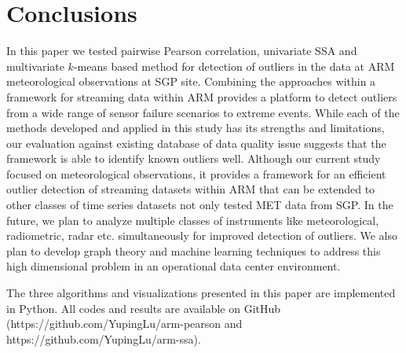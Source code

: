 \section{Conclusions}
In this paper we tested pairwise Pearson correlation,
univariate SSA and multivariate $k$-means based method for detection of
outliers in the data at ARM meteorological observations at SGP site. 
Combining the approaches within a framework for
streaming data within ARM provides a platform to detect outliers
from a wide range of sensor failure scenarios to extreme events.
While each of the methods developed and applied in this study has its
strengths and limitations, our evaluation against existing database of
data quality issue suggests that the framework is able to identify known
outliers well. Although our current study focused on
meteorological observations, it provides a framework for an efficient
outlier detection of streaming datasets within ARM that can be extended to
other classes of time series datasets not only tested MET data from SGP. 
In the future, we plan to analyze multiple
classes of instruments like meteorological, radiometric, radar etc.
simultaneously for improved detection of outliers. We also plan to
develop graph theory \cite{phillips2015graph} and machine learning techniques to address this
high dimensional problem in an operational data center environment.

The three algorithms and visualizations presented in this paper are 
implemented in Python. All codes and results are available on GitHub 
(https://github.com/YupingLu/arm-pearson and https://github.com/YupingLu/arm-ssa). 
